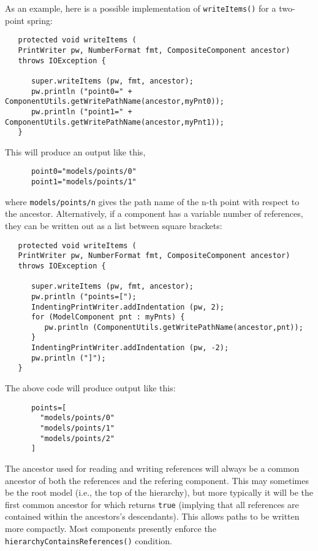 \documentclass{article}
\begin{document}
As an example, here is a possible implementation of {\tt writeItems()}
for a two-point spring:
\begin{lstlisting}
   protected void writeItems (
   PrintWriter pw, NumberFormat fmt, CompositeComponent ancestor)
   throws IOException {

      super.writeItems (pw, fmt, ancestor);
      pw.println ("point0=" + ComponentUtils.getWritePathName(ancestor,myPnt0));
      pw.println ("point1=" + ComponentUtils.getWritePathName(ancestor,myPnt1));
   }
\end{lstlisting}
This will produce an output like this,
\begin{lstlisting}
      point0="models/points/0"
      point1="models/points/1"
\end{lstlisting}
where {\tt models/points/n} gives the path name of the n-th point with
respect to the ancestor.
Alternatively, if a component has a variable number of references,
they can be written out as a list between square brackets:
\begin{lstlisting}
   protected void writeItems (
   PrintWriter pw, NumberFormat fmt, CompositeComponent ancestor)
   throws IOException {

      super.writeItems (pw, fmt, ancestor);
      pw.println ("points=[");
      IndentingPrintWriter.addIndentation (pw, 2);
      for (ModelComponent pnt : myPnts) {
         pw.println (ComponentUtils.getWritePathName(ancestor,pnt));
      }
      IndentingPrintWriter.addIndentation (pw, -2);
      pw.println ("]");
   }
\end{lstlisting}
The above code will produce output like this:
\begin{lstlisting}
      points=[
        "models/points/0"
        "models/points/1"
        "models/points/2"
      ]
\end{lstlisting}

\begin{sideblock}
The ancestor used for reading and writing references will always be a
common ancestor of both the references and the refering component.
This may sometimes be the root model (i.e., the top of the hierarchy),
but more typically it will be the first common ancestor for which
 returns {\tt true} (implying that all
references are contained within the ancestors's descendants).  This allows
paths to be written more compactly.
Most  components
presently enforce the {\tt hierarchyContainsReferences()} condition.
\end{sideblock}
\end{document}
